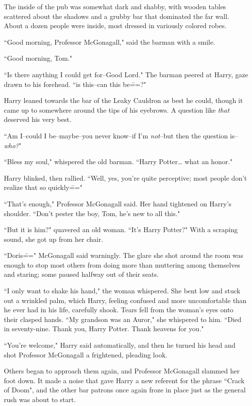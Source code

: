 The inside of the pub was somewhat dark and shabby, with wooden tables scattered about the shadows and a grubby bar that dominated the far wall. About a dozen people were inside, most dressed in variously colored robes.

``Good morning, Professor McGonagall," said the barman with a smile.

``Good morning, Tom."

``Is there anything I could get for\---Good Lord." The barman peered at Harry, gaze drawn to his forehead. ``is this\---can this be\===?"

Harry leaned towards the bar of the Leaky Cauldron as best he could, though it came up to somewhere around the tips of his eyebrows. A question like \emph{that} deserved his very best.

``Am I\---could I be\---maybe\---you never know\---if I'm \emph{not}\---but then the question is\---\emph{who?}"

``Bless my soul," whispered the old barman. ``Harry Potter{\ldots} what an honor."

Harry blinked, then rallied. ``Well, yes, you're quite perceptive; most people don't realize that so quickly\==="

``That's enough," Professor McGonagall said. Her hand tightened on Harry's shoulder. ``Don't pester the boy, Tom, he's new to all this."

``But it is him?" quavered an old woman. ``It's Harry Potter?" With a scraping sound, she got up from her chair.

``Doris\===" McGonagall said warningly. The glare she shot around the room was enough to stop most others from doing more than muttering among themselves and staring; some paused halfway out of their seats.

``I only want to shake his hand," the woman whispered. She bent low and stuck out a wrinkled palm, which Harry, feeling confused and more uncomfortable than he ever had in his life, carefully shook. Tears fell from the woman's eyes onto their clasped hands. ``My grandson was an Auror," she whispered to him. ``Died in seventy-nine. Thank you, Harry Potter. Thank heavens for you."

``You're welcome," Harry said automatically, and then he turned his head and shot Professor McGonagall a frightened, pleading look.

Others began to approach them again, and Professor McGonagall slammed her foot down. It made a noise that gave Harry a new referent for the phrase ``Crack of Doom", and the other bar patrons once again froze in place just as the general rush was about to start.

